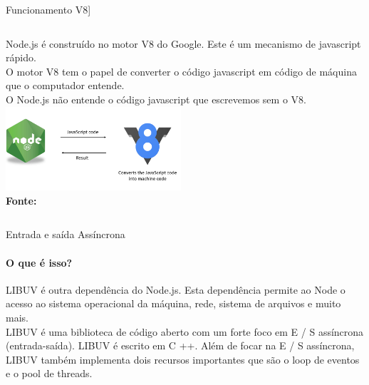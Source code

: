 \documentclass{beamer}
\begin{document}
    \begin{frame}[label=lists]{Funcionamento V8]}
      \begin{columns}[onlytextwidth]
          Node.js é construído no motor V8 do Google. Este é um mecanismo de javascript rápido. \\
          O motor V8 tem o papel de converter o código javascript em código de máquina que o computador entende.\\
          \vspace{0.5cm}
	O Node.js não entende o código javascript que escrevemos sem o V8.
            \includegraphics[width=65mm]{resources/aula1_7.png}\\
            \tiny{\textbf{Fonte:} \cite{ich2021}}

      \end{columns}
    \end{frame}
    
    \begin{frame}[label=lists]{Entrada e saída Assíncrona}
     \framesubtitle{O que é isso?}%

          LIBUV é outra  dependência do Node.js. Esta dependência permite ao Node o acesso ao sistema operacional da máquina, rede, sistema de arquivos e muito mais.\\
          \vspace{0.5cm}
          LIBUV é uma biblioteca de código aberto com um forte foco em E / S assíncrona (entrada-saída). LIBUV é escrito em C ++. Além de focar na E / S assíncrona, LIBUV também implementa dois recursos importantes que são o loop de eventos e o pool de threads.          
          
    \end{frame}
    
\end{document}
